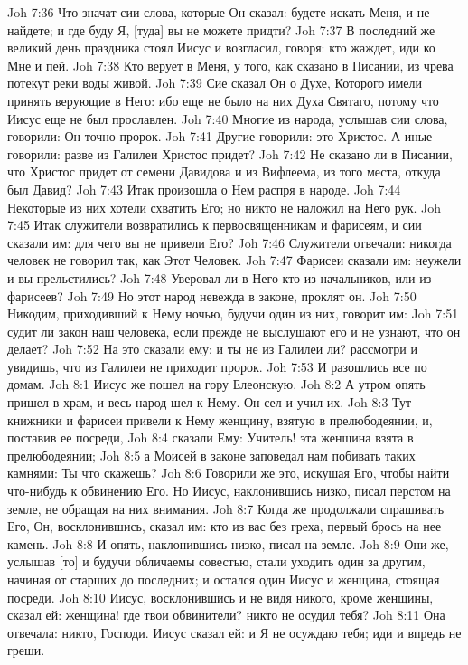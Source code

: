 Joh 7:36  Что значат сии слова, которые Он сказал: будете искать Меня, и не найдете; и где буду Я, [туда] вы не можете придти?
Joh 7:37  В последний же великий день праздника стоял Иисус и возгласил, говоря: кто жаждет, иди ко Мне и пей.
Joh 7:38  Кто верует в Меня, у того, как сказано в Писании, из чрева потекут реки воды живой.
Joh 7:39  Сие сказал Он о Духе, Которого имели принять верующие в Него: ибо еще не было на них Духа Святаго, потому что Иисус еще не был прославлен.
Joh 7:40  Многие из народа, услышав сии слова, говорили: Он точно пророк.
Joh 7:41  Другие говорили: это Христос. А иные говорили: разве из Галилеи Христос придет?
Joh 7:42  Не сказано ли в Писании, что Христос придет от семени Давидова и из Вифлеема, из того места, откуда был Давид?
Joh 7:43  Итак произошла о Нем распря в народе.
Joh 7:44  Некоторые из них хотели схватить Его; но никто не наложил на Него рук.
Joh 7:45  Итак служители возвратились к первосвященникам и фарисеям, и сии сказали им: для чего вы не привели Его?
Joh 7:46  Служители отвечали: никогда человек не говорил так, как Этот Человек.
Joh 7:47  Фарисеи сказали им: неужели и вы прельстились?
Joh 7:48  Уверовал ли в Него кто из начальников, или из фарисеев?
Joh 7:49  Но этот народ невежда в законе, проклят он.
Joh 7:50  Никодим, приходивший к Нему ночью, будучи один из них, говорит им:
Joh 7:51  судит ли закон наш человека, если прежде не выслушают его и не узнают, что он делает?
Joh 7:52  На это сказали ему: и ты не из Галилеи ли? рассмотри и увидишь, что из Галилеи не приходит пророк.
Joh 7:53  И разошлись все по домам.
Joh 8:1  Иисус же пошел на гору Елеонскую.
Joh 8:2  А утром опять пришел в храм, и весь народ шел к Нему. Он сел и учил их.
Joh 8:3  Тут книжники и фарисеи привели к Нему женщину, взятую в прелюбодеянии, и, поставив ее посреди,
Joh 8:4  сказали Ему: Учитель! эта женщина взята в прелюбодеянии;
Joh 8:5  а Моисей в законе заповедал нам побивать таких камнями: Ты что скажешь?
Joh 8:6  Говорили же это, искушая Его, чтобы найти что-нибудь к обвинению Его. Но Иисус, наклонившись низко, писал перстом на земле, не обращая на них внимания.
Joh 8:7  Когда же продолжали спрашивать Его, Он, восклонившись, сказал им: кто из вас без греха, первый брось на нее камень.
Joh 8:8  И опять, наклонившись низко, писал на земле.
Joh 8:9  Они же, услышав [то] и будучи обличаемы совестью, стали уходить один за другим, начиная от старших до последних; и остался один Иисус и женщина, стоящая посреди.
Joh 8:10  Иисус, восклонившись и не видя никого, кроме женщины, сказал ей: женщина! где твои обвинители? никто не осудил тебя?
Joh 8:11  Она отвечала: никто, Господи. Иисус сказал ей: и Я не осуждаю тебя; иди и впредь не греши.
